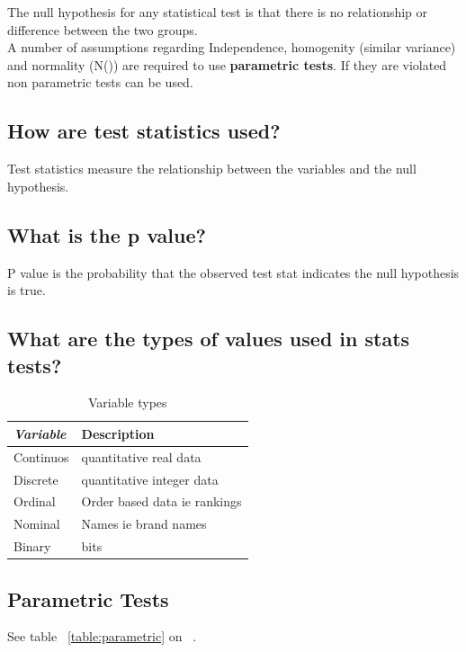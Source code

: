 \documentclass[11pt]{scrartcl} %
\begin{document}
The null hypothesis for any statistical test is that there is no relationship or difference between the two groups.\\

A number of assumptions regarding Independence, homogenity (similar variance) and normality (N()) are required to use
\textbf{parametric tests}. If they are violated non parametric tests can be used.

\subsection{How are test statistics used?}

Test statistics measure the relationship between the variables and the null hypothesis.

\subsection{What is the p value?}

P value is the probability that the observed test stat indicates the null hypothesis is true.

\subsection{What are the types of values used in stats tests?}

\begin{table}[h] %
	\centering %
	\begin{tabular}{l l}
		\toprule
		\textit{Variable} & \textbf{Description} \\
		\midrule
		Continuos & quantitative real data\\
		Discrete & quantitative integer data\\
		Ordinal & Order based data ie rankings\\
		Nominal & Names ie brand names \\
		Binary & bits \\
		\bottomrule
	\end{tabular}
	\caption{Variable types}
\end{table}

\subsection{Parametric Tests}

See table ~\ref{table:parametric} on ~\pageref{table:parametric}.
\end{document}
